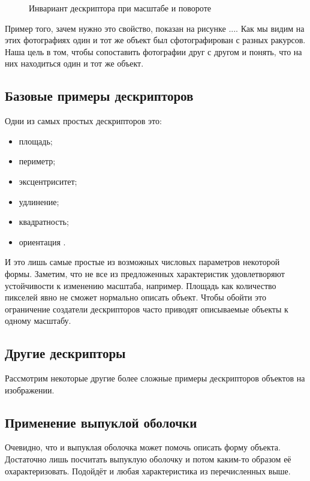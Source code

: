 \begin{figure}[H]
	\centering
	
	\caption{Инвариант дескриптора при масштабе и повороте}
	\label{img:descriptor_invariant}
\end{figure}

Пример того, зачем нужно это свойство, показан на рисунке .... Как мы видим на этих фотографиях один и тот же объект был сфотографирован с разных ракурсов. Наша цель в том, чтобы сопоставить фотографии друг с другом и понять, что на них находиться один и тот же объект.


\subsection{Базовые примеры дескрипторов}

Одни из самых простых дескрипторов это:
\begin{itemize}
	\item площадь;
	\item периметр;
	\item эксцентриситет;
	\item удлинение;
	\item квадратность;
	\item ориентация \cite{morse2000lecture}.
\end{itemize}

И это лишь самые простые из возможных числовых параметров некоторой формы. Заметим, что не все из предложенных характеристик удовлетворяют устойчивости к изменению масштаба, например. Площадь как количество пикселей явно не сможет нормально описать объект. Чтобы обойти это ограничение создатели дескрипторов часто приводят описываемые объекты к одному масштабу.

\subsection{Другие дескрипторы}

Рассмотрим некоторые другие более сложные примеры дескрипторов объектов на изображении.

\subsection{Применение выпуклой оболочки}

Очевидно, что и выпуклая оболочка может помочь описать форму объекта. Достаточно лишь посчитать выпуклую оболочку и потом каким-то образом её охарактеризовать. Подойдёт и любая характеристика из перечисленных выше.

